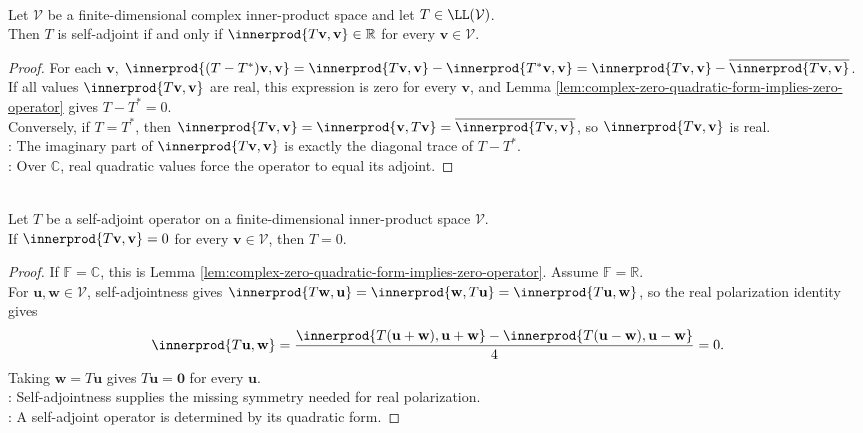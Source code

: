 \begin{proposition} \label{prop:complex-quadratic-form-self-adjoint-characterization} \\
Let $\mathcal{V}$ be a finite-dimensional complex inner-product space and let $T\in\LL(\mathcal{V})$.\\
Then $T$ is self-adjoint if and only if $\innerprod{T\mathbf{v},\mathbf{v}}\in\mathbb{R}$ for every $\mathbf{v}\in\mathcal{V}$.
\begin{proof}
For each $\mathbf{v}$, $\innerprod{(T-T^*)\mathbf{v},\mathbf{v}} =\innerprod{T\mathbf{v},\mathbf{v}}-\innerprod{T^*\mathbf{v},\mathbf{v}} =\innerprod{T\mathbf{v},\mathbf{v}}-\overline{\innerprod{T\mathbf{v},\mathbf{v}}}$.\\
If all values $\innerprod{T\mathbf{v},\mathbf{v}}$ are real, this expression is zero for every $\mathbf{v}$, and Lemma \ref{lem:complex-zero-quadratic-form-implies-zero-operator} gives $T-T^*=0$.\\
Conversely, if $T=T^*$, then $\innerprod{T\mathbf{v},\mathbf{v}} =\innerprod{\mathbf{v},T\mathbf{v}} =\overline{\innerprod{T\mathbf{v},\mathbf{v}}}$, so $\innerprod{T\mathbf{v},\mathbf{v}}$ is real.\\
: The imaginary part of $\innerprod{T\mathbf{v},\mathbf{v}}$ is exactly the diagonal trace of $T-T^*$.\\
: Over $\mathbb{C}$, real quadratic values force the operator to equal its adjoint.
\end{proof}
\end{proposition}

\begin{proposition} \label{prop:self-adjoint-zero-quadratic-form-implies-zero} \\
Let $T$ be a self-adjoint operator on a finite-dimensional inner-product space $\mathcal{V}$.\\
If $\innerprod{T\mathbf{v},\mathbf{v}}=0$ for every $\mathbf{v}\in\mathcal{V}$, then $T=0$.
\begin{proof}
If $\mathbb{F}=\mathbb{C}$, this is Lemma \ref{lem:complex-zero-quadratic-form-implies-zero-operator}. Assume $\mathbb{F}=\mathbb{R}$.\\
For $\mathbf{u},\mathbf{w}\in\mathcal{V}$, self-adjointness gives $\innerprod{T\mathbf{w},\mathbf{u}}=\innerprod{\mathbf{w},T\mathbf{u}}=\innerprod{T\mathbf{u},\mathbf{w}}$, so the real polarization identity gives
\begin{align}
\innerprod{T\mathbf{u},\mathbf{w}}
=\frac{\innerprod{T(\mathbf{u}+\mathbf{w}),\mathbf{u}+\mathbf{w}}-\innerprod{T(\mathbf{u}-\mathbf{w}),\mathbf{u}-\mathbf{w}}}{4}=0.
\nonumber
\end{align}
Taking $\mathbf{w}=T\mathbf{u}$ gives $T\mathbf{u}=\mathbf{0}$ for every $\mathbf{u}$.\\
: Self-adjointness supplies the missing symmetry needed for real polarization.\\
: A self-adjoint operator is determined by its quadratic form.
\end{proof}
\end{proposition}


